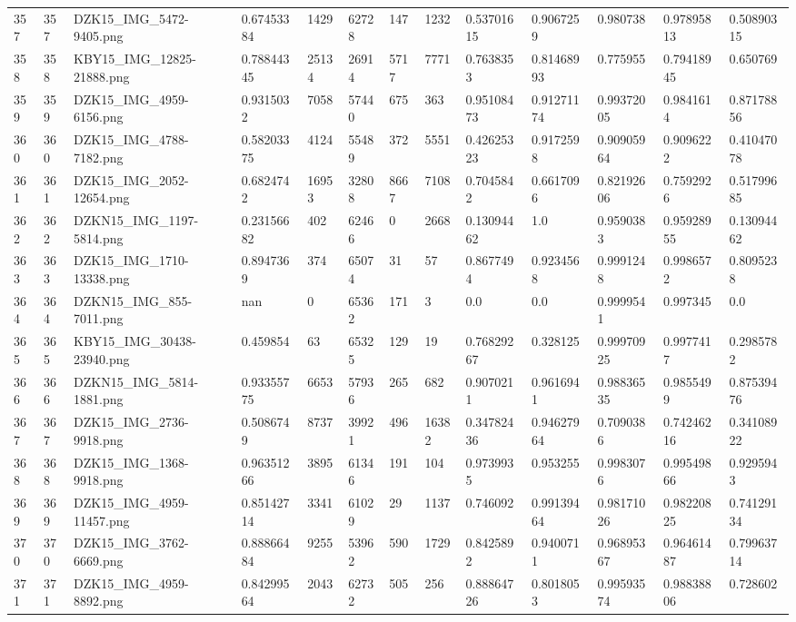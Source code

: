 \documentclass[11pt, a4paper, twoside]{report}
\begin{document}
\begin{longtable}[c]{@{}lllllllllllll@{}}
357 & 357 & DZK15\_IMG\_5472-9405.png & 0.67453384 & 1429 & 62728 & 147 & 1232 & 0.53701615 & 0.9067259 & 0.980738 & 0.97895813 & 0.50890315 \\
358 & 358 & KBY15\_IMG\_12825-21888.png & 0.78844345 & 25134 & 26914 & 5717 & 7771 & 0.7638353 & 0.81468993 & 0.775955 & 0.79418945 & 0.650769 \\
359 & 359 & DZK15\_IMG\_4959-6156.png & 0.9315032 & 7058 & 57440 & 675 & 363 & 0.95108473 & 0.91271174 & 0.99372005 & 0.9841614 & 0.87178856 \\
360 & 360 & DZK15\_IMG\_4788-7182.png & 0.58203375 & 4124 & 55489 & 372 & 5551 & 0.42625323 & 0.9172598 & 0.90905964 & 0.9096222 & 0.41047078 \\
361 & 361 & DZK15\_IMG\_2052-12654.png & 0.6824742 & 16953 & 32808 & 8667 & 7108 & 0.7045842 & 0.6617096 & 0.82192606 & 0.7592926 & 0.51799685 \\
362 & 362 & DZKN15\_IMG\_1197-5814.png & 0.23156682 & 402 & 62466 & 0 & 2668 & 0.13094462 & 1.0 & 0.9590383 & 0.95928955 & 0.13094462 \\
363 & 363 & DZK15\_IMG\_1710-13338.png & 0.8947369 & 374 & 65074 & 31 & 57 & 0.8677494 & 0.9234568 & 0.9991248 & 0.9986572 & 0.8095238 \\
364 & 364 & DZKN15\_IMG\_855-7011.png & nan & 0 & 65362 & 171 & 3 & 0.0 & 0.0 & 0.9999541 & 0.997345 & 0.0 \\
365 & 365 & KBY15\_IMG\_30438-23940.png & 0.459854 & 63 & 65325 & 129 & 19 & 0.76829267 & 0.328125 & 0.99970925 & 0.9977417 & 0.2985782 \\
366 & 366 & DZKN15\_IMG\_5814-1881.png & 0.93355775 & 6653 & 57936 & 265 & 682 & 0.9070211 & 0.9616941 & 0.98836535 & 0.9855499 & 0.87539476 \\
367 & 367 & DZK15\_IMG\_2736-9918.png & 0.5086749 & 8737 & 39921 & 496 & 16382 & 0.34782436 & 0.94627964 & 0.7090386 & 0.74246216 & 0.34108922 \\
368 & 368 & DZK15\_IMG\_1368-9918.png & 0.96351266 & 3895 & 61346 & 191 & 104 & 0.9739935 & 0.953255 & 0.9983076 & 0.99549866 & 0.9295943 \\
369 & 369 & DZK15\_IMG\_4959-11457.png & 0.85142714 & 3341 & 61029 & 29 & 1137 & 0.746092 & 0.99139464 & 0.98171026 & 0.98220825 & 0.74129134 \\
370 & 370 & DZK15\_IMG\_3762-6669.png & 0.88866484 & 9255 & 53962 & 590 & 1729 & 0.8425892 & 0.9400711 & 0.96895367 & 0.96461487 & 0.79963714 \\
371 & 371 & DZK15\_IMG\_4959-8892.png & 0.84299564 & 2043 & 62732 & 505 & 256 & 0.88864726 & 0.8018053 & 0.99593574 & 0.98838806 & 0.728602 \\

\end{longtable}
\end{document}

